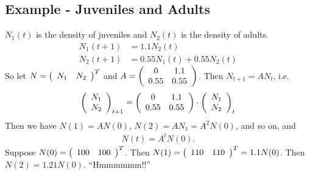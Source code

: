 \documentclass{article}
\begin{document}
        \subsection{Example - Juveniles and Adults}
            $N_1(t)$ is the density of juveniles and $N_2(t)$ is the density of adults.
            \begin{align}
                N_1(t+1) &= 1.1N_2(t) \\
                N_2(t+1) &= 0.55N_1(t) + 0.55N_2(t)
            \end{align}
            So let $N = \qty(\begin{array}{cc}N_1 & N_2\end{array})^T$ and $A = \qty(\begin{array}{cc}0 & 1.1 \\ 0.55 & 0.55\end{array})$.  Then $N_{t+1} = AN_t$, i.e.
            \begin{align}
                \qty(\begin{array}{c}
                    N_1 \\
                    N_2
                \end{array})_{t+1} = \qty(\begin{array}{cc}
                    0 & 1.1 \\
                    0.55 & 0.55
                \end{array})\cdot \qty(\begin{array}{c}
                    N_1 \\
                    N_2
                \end{array})_t
            \end{align}
            Then we have $N(1) = AN(0)$, $N(2) = AN_1 = A^2N(0)$, and so on, and
            \begin{align}
                N(t) = A^tN(0).
            \end{align}
            Suppose $N(0) = \qty(\begin{array}{cc} 100 & 100 \end{array})^T$.  Then $N(1) = \qty(\begin{array}{cc}110 & 110\end{array})^T = 1.1N(0)$.  Then $N(2) = 1.21N(0)$. ``Hmmmmmm!!''
\end{document}

